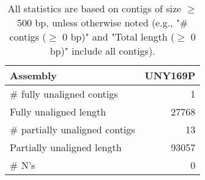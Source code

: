 \documentclass[12pt,a4paper]{article}
\begin{document}
\begin{table}[ht]
\begin{center}
\caption{All statistics are based on contigs of size $\geq$ 500 bp, unless otherwise noted (e.g., "\# contigs ($\geq$ 0 bp)" and "Total length ($\geq$ 0 bp)" include all contigs).}
\begin{tabular}{|l*{1}{|r}|}
\hline
Assembly & UNY169P \\ \hline
\# fully unaligned contigs & 1 \\ \hline
Fully unaligned length & 27768 \\ \hline
\# partially unaligned contigs & 13 \\ \hline
Partially unaligned length & 93057 \\ \hline
\# N's & 0 \\ \hline
\end{tabular}
\end{center}
\end{table}
\end{document}
